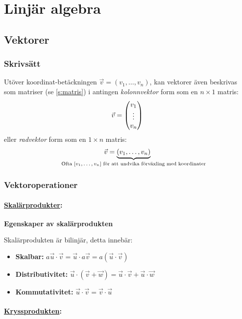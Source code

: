 \section{Linjär algebra}

\subsection{Vektorer}
\subsubsection{Skrivsätt}
Utöver koordinat-betäckningen $\vec{v}=(v_1,\dots,v_n)$, kan vektorer även beskrivas
som matriser (se \ref{s:matris}) i antingen \emph{kolonnvektor} form som en $n\times 1$ matris:
$$
	\vec{v}=\qty(\begin{matrix}
		v_1\\\vdots\\v_n
	\end{matrix})
$$
eller \emph{radvektor} form som en $1\times n$ matris:
$$
	\vec{v}=\underbrace{\qty(v_1,\dots,v_n)}_{\text{\makebox[0pt]{Ofta $[v_1,\dots,v_n]$ för att undvika förväxling med koordinater}}}
$$

\subsubsection{Vektoroperationer}

\paragraph{\href{https://sv.wikipedia.org/wiki/Skalärprodukt}{Skalärprodukter}:}

\begin{features}
	\textbf{Egenskaper av skalärprodukten}

	Skalärprodukten är bilinjär, detta innebär:
	\begin{itemize}
		\item \textbf{Skalbar:} $a\vec{u}\cdot\vec{v}=\vec{u}\cdot a\vec{v}=a(\vec{u}\cdot\vec{v})$
		\item \textbf{Distributivitet:} $\vec{u}\cdot(\vec{v}+\vec{w})=\vec{u}\cdot\vec{v}+\vec{u}\cdot\vec{w}$
		\item \textbf{Kommutativitet:} $\vec{u}\cdot\vec{v}=\vec{v}\cdot\vec{u}$
	\end{itemize}
\end{features}

\paragraph{\href{https://sv.wikipedia.org/wiki/Kryssprodukt}{Kryssprodukten}:}

